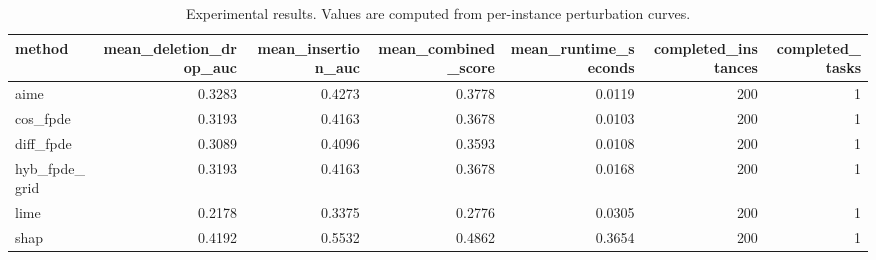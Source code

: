 \begin{table}[t]
\caption{Experimental results. Values are computed from per-instance perturbation curves.}
\label{tab:main_results_computed}
\centering
\begin{tabular}{lrrrrrr}
\toprule
method & mean\_deletion\_drop\_auc & mean\_insertion\_auc & mean\_combined\_score & mean\_runtime\_seconds & completed\_instances & completed\_tasks \\
\midrule
aime & 0.3283 & 0.4273 & 0.3778 & 0.0119 & 200 & 1 \\
cos\_fpde & 0.3193 & 0.4163 & 0.3678 & 0.0103 & 200 & 1 \\
diff\_fpde & 0.3089 & 0.4096 & 0.3593 & 0.0108 & 200 & 1 \\
hyb\_fpde\_grid & 0.3193 & 0.4163 & 0.3678 & 0.0168 & 200 & 1 \\
lime & 0.2178 & 0.3375 & 0.2776 & 0.0305 & 200 & 1 \\
shap & 0.4192 & 0.5532 & 0.4862 & 0.3654 & 200 & 1 \\
\bottomrule
\end{tabular}

\end{table}
